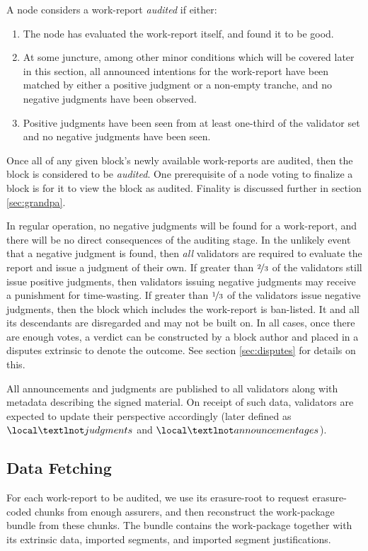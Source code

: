 A node considers a work-report \emph{audited} if either:
\begin{enumerate}
  \item The node has evaluated the work-report itself, and found it to be good.
  \item At some juncture, among other minor conditions which will be covered later in this section, all announced intentions for the work-report have been matched by either a positive judgment or a non-empty tranche, and no negative judgments have been observed.
  \item Positive judgments have been seen from at least one-third of the validator set and no negative judgments have been seen.
\end{enumerate}
Once all of any given block's newly available work-reports are audited, then the block is considered to be \emph{audited}. One prerequisite of a node voting to finalize a block is for it to view the block as audited. Finality is discussed further in section \ref{sec:grandpa}.

In regular operation, no negative judgments will be found for a work-report, and there will be no direct consequences of the auditing stage. In the unlikely event that a negative judgment is found, then \emph{all} validators are required to evaluate the report and issue a judgment of their own. If greater than $\nicefrac{2}{3}$ of the validators still issue positive judgments, then validators issuing negative judgments may receive a punishment for time-wasting. If greater than $\nicefrac{1}{3}$ of the validators issue negative judgments, then the block which includes the work-report is ban-listed. It and all its descendants are disregarded and may not be built on. In all cases, once there are enough votes, a verdict can be constructed by a block author and placed in a disputes extrinsic to denote the outcome. See section \ref{sec:disputes} for details on this.

All announcements and judgments are published to all validators along with metadata describing the signed material. On receipt of such data, validators are expected to update their perspective accordingly (later defined as $\local¬judgments$ and $\local¬announcementages$).

\subsection{Data Fetching}
\label{sec:auditfetching}

For each work-report to be audited, we use its erasure-root to request erasure-coded chunks from enough assurers, and then reconstruct the work-package bundle from these chunks. The bundle contains the work-package together with its extrinsic data, imported segments, and imported segment justifications.

